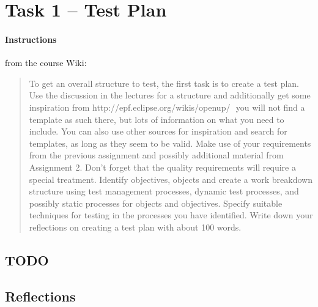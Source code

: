 %
%
%
%


\section{Task 1 -- Test Plan}

\paragraph{Instructions}\label{task-1-instructions}
from the course Wiki\cite{1dv600:lab3:instructions}:

\begin{quote}
  To get an overall structure to test, the first task is to create a test plan.
  Use the discussion in the lectures for a structure and additionally get some
  inspiration from http://epf.eclipse.org/wikis/openup/ ­­ you will not find a
  template as such there, but lots of information on what you need to include.
  You can also use other sources for inspiration and search for templates, as
  long as they seem to be valid. Make use of your requirements from the
  previous assignment and possibly additional material from Assignment 2. Don’t
  forget that the quality requirements will require a special treatment.
  Identify objectives, objects and create a work breakdown structure using test
  management processes, dynamic test processes, and possibly static processes
  for objects and objectives. Specify suitable techniques for testing in the
  processes you have identified. Write down your reflections on creating a test
  plan with about 100 words.
\end{quote}



\subsection{TODO}\label{task-1a}



\subsection{Reflections}\label{task-1c-reflect}

